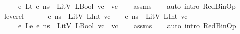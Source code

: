 \begin{isabellebody}
\ \ \ {\isachardoublequoteopen}{\isasymLambda}{\isacharcomma}{\kern0pt}{\isasymGamma}{\isacharcomma}{\kern0pt}{\isasymOmega}\ {\isasymturnstile}\ {\isasymlangle}e{}\ {\isasymguillemotleft}Lt{\isasymguillemotright}\ e{}{\isacharcomma}{\kern0pt}\ ns{\isasymrangle}\ {\isasymDown}\ LitV\ {\isacharparenleft}{\kern0pt}LBool\ {\isacharparenleft}{\kern0pt}vc{}\ {\isacharless}{\kern0pt}\ vc{}{\isacharparenright}{\kern0pt}{\isacharparenright}{\kern0pt}{\isachardoublequoteclose}\isanewline
%
\isadelimproof
\ \ %
\endisadelimproof
%
\isatagproof
{}\isamarkupfalse%
\ assms\isanewline
\ \ \isamarkupfalse%
\ {\isacharparenleft}{\kern0pt}auto\ intro{\isacharcolon}{\kern0pt}\ RedBinOp{\isacharparenright}{\kern0pt}%
\endisatagproof
{\isafoldproof}%
%
\isadelimproof
\isanewline
%
\endisadelimproof
\isanewline
{}\isamarkupfalse%
\ le{\isacharunderscore}{\kern0pt}vc{\isacharunderscore}{\kern0pt}rel{\isacharcolon}{\kern0pt}\ \isanewline
\ \ \ {\isachardoublequoteopen}{\isasymLambda}{\isacharcomma}{\kern0pt}{\isasymGamma}{\isacharcomma}{\kern0pt}{\isasymOmega}\ {\isasymturnstile}\ {\isasymlangle}e{}{\isacharcomma}{\kern0pt}\ ns{\isasymrangle}\ {\isasymDown}\ LitV\ {\isacharparenleft}{\kern0pt}LInt\ vc{}{\isacharparenright}{\kern0pt}{\isachardoublequoteclose}\ \ {\isachardoublequoteopen}{\isasymLambda}{\isacharcomma}{\kern0pt}{\isasymGamma}{\isacharcomma}{\kern0pt}{\isasymOmega}\ {\isasymturnstile}\ {\isasymlangle}e{}{\isacharcomma}{\kern0pt}\ ns{\isasymrangle}\ {\isasymDown}\ LitV\ {\isacharparenleft}{\kern0pt}LInt\ vc{}{\isacharparenright}{\kern0pt}{\isachardoublequoteclose}\isanewline
\ \ \ {\isachardoublequoteopen}{\isasymLambda}{\isacharcomma}{\kern0pt}{\isasymGamma}{\isacharcomma}{\kern0pt}{\isasymOmega}\ {\isasymturnstile}\ {\isasymlangle}e{}\ {\isasymguillemotleft}Le{\isasymguillemotright}\ e{}{\isacharcomma}{\kern0pt}\ ns{\isasymrangle}\ {\isasymDown}\ LitV\ {\isacharparenleft}{\kern0pt}LBool\ {\isacharparenleft}{\kern0pt}vc{}\ {\isasymle}\ vc{}{\isacharparenright}{\kern0pt}{\isacharparenright}{\kern0pt}{\isachardoublequoteclose}\isanewline
%
\isadelimproof
\ \ %
\endisadelimproof
%
\isatagproof
{}\isamarkupfalse%
\ assms\isanewline
\ \ \isamarkupfalse%
\ {\isacharparenleft}{\kern0pt}auto\ intro{\isacharcolon}{\kern0pt}\ RedBinOp{\isacharparenright}{\kern0pt}%

\end{isabellebody}

